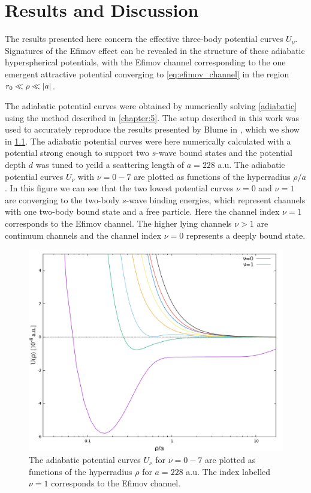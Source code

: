 \chapter{Results and Discussion}
The results presented here concern the effective three-body potential curves $U_{\nu}$. Signatures of the Efimov effect can be revealed in the structure of these adiabatic hyperspherical potentials, with the Efimov channel corresponding to the one emergent attractive potential converging to \eqref{eq:efimov_channel} in the region $r_0 \ll \rho \ll
\lvert a\rvert$.

The adiabatic potential curves were obtained by numerically solving  \eqref{adiabatic} using the method described in \cref{chapter:5}. The setup described in this work was used to accurately reproduce the results presented by Blume in \cite{Blume2002}, which we show in \cref{fig:res_2}. The adiabatic potential curves were here numerically calculated with a potential strong enough to support two $s$-wave bound states and the potential depth $d$ was tuned to yeild a scattering length of $a=228$ a.u. The adiabatic potential curves $U_{\nu}$ with $\nu = 0-7$ are plotted as functions of the hyperradius $\rho/a$. In this figure we can see that the two lowest potential curves $\nu = 0$ and $\nu = 1$ are converging to the two-body $s$-wave binding energies, which represent channels with one two-body bound  state and a free particle. Here the channel index $\nu=1$ corresponds to the Efimov channel. The higher lying channels $\nu>1$ are continuum channels and the channel index $\nu=0$ represents a deeply bound state.

\begin{figure}
	\includegraphics[width=\linewidth]{adiabatic.pdf}
	\caption{The adiabatic potential curves $U_{\nu}$ for $\nu=0-7$ are plotted as functions of the hyperradius $\rho$ for $a=228$ a.u. The index labelled $\nu=1$ corresponds to the Efimov channel.}
	\label{fig:res_2}
\end{figure}

